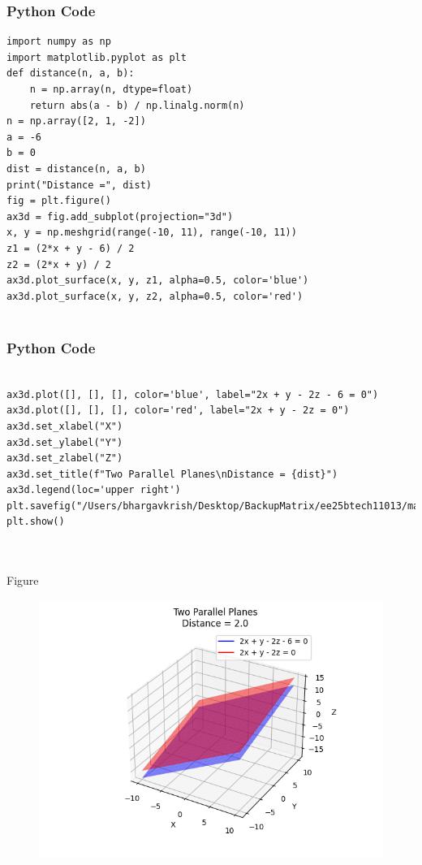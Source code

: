 \documentclass{beamer}
\begin{document}
\begin{frame}[fragile]
    \frametitle{Python Code }

    \begin{lstlisting}
import numpy as np
import matplotlib.pyplot as plt
def distance(n, a, b):
    n = np.array(n, dtype=float)
    return abs(a - b) / np.linalg.norm(n)
n = np.array([2, 1, -2])
a = -6
b = 0
dist = distance(n, a, b)
print("Distance =", dist)
fig = plt.figure()
ax3d = fig.add_subplot(projection="3d")
x, y = np.meshgrid(range(-10, 11), range(-10, 11))
z1 = (2*x + y - 6) / 2
z2 = (2*x + y) / 2
ax3d.plot_surface(x, y, z1, alpha=0.5, color='blue')
ax3d.plot_surface(x, y, z2, alpha=0.5, color='red')


    \end{lstlisting}
\end{frame}

\begin{frame}[fragile]
    \frametitle{Python Code }

    \begin{lstlisting}

ax3d.plot([], [], [], color='blue', label="2x + y - 2z - 6 = 0")
ax3d.plot([], [], [], color='red', label="2x + y - 2z = 0")
ax3d.set_xlabel("X")
ax3d.set_ylabel("Y")
ax3d.set_zlabel("Z")
ax3d.set_title(f"Two Parallel Planes\nDistance = {dist}")
ax3d.legend(loc='upper right')
plt.savefig("/Users/bhargavkrish/Desktop/BackupMatrix/ee25btech11013/matgeo/4.6.1/figs/Figure_1.png")
plt.show()



    \end{lstlisting}
\end{frame}



\begin{frame}{Figure}
\begin{figure}[h!]
    \centering
    \includegraphics[height=0.5\textheight, keepaspectratio]{figs/Figure_1.png}
\end{figure}
\end{frame}
\end{document}
